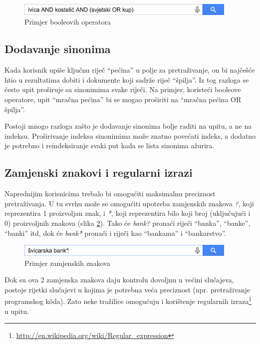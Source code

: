 \documentclass[a4paper,twoside,12pt]{scrreprt}
\begin{document}
\begin{figure}[H]
  \centering
  \includegraphics[width=300pt]{boolean}
  \caption{Primjer booleovih operatora}
  \label{boolean}
\end{figure}

\subsection{Dodavanje sinonima}

Kada korisnik upiše ključnu riječ ``pećina'' u polje za pretraživanje, on bi najčešće htio u rezultatima dobiti i dokumente koji sadrže riječ ``špilja''. Iz tog razloga se često upit proširuje sa sinonimima svake riječi. Na primjer, koristeći booleove operatore, upit ``mračna pećina'' bi se mogao proširiti na ``mračna pećina OR špilja''.

Postoji mnogo razloga zašto je dodavanje sinonima bolje raditi na upitu, a ne na indeksu. Proširivanje indeksa sinonimima može znatno povećati indeks, a dodatno je potrebno i reindeksiranje svaki put kada se lista sinonima ažurira.

\subsection{Zamjenski znakovi i regularni izrazi}

Naprednijim korisnicima trebalo bi omogućiti maksimalnu preciznost pretraživanja. U tu svrhu može se omogućiti upotreba zamjenskih znakova \textit{?}, koji reprezentira 1 proizvoljan znak, i \textit{*}, koji reprezentira bilo koji broj (uključujući i 0) proizvoljnih znakova (slika \ref{wildcards}). Tako će \textit{bank?} pronaći riječi ``banka'', ``banke'', ``banki'' itd, dok će \textit{bank*} pronaći i riječi kao ``bankama'' i ``bankarstvo''.

\begin{figure}[H]
  \centering
  \includegraphics[width=300pt]{wildcards}
  \caption{Primjer zamjenskih znakova}
  \label{wildcards}
\end{figure}

Dok su ova 2 zamjenska znakova daju kontrolu dovoljnu u većini slučajeva, postoje rijetki slučajevi u kojima je potrebna veća preciznost (npr. pretraživanje programskog kôda). Zato neke tražilice omogućuju i korištenje regularnih izraza\footnote{\url{http://en.wikipedia.org/wiki/Regular_expression}} u upitu.
\end{document}
